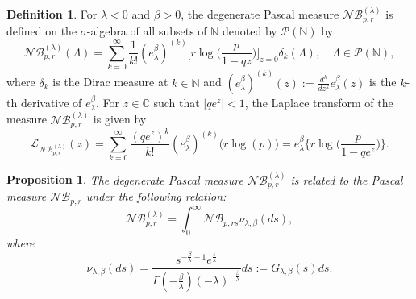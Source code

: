 \documentclass{birkjour}
\newtheorem{prop}[thm]{Proposition}
\theoremstyle{definition}
\newtheorem{defn}[thm]{Definition}
\theoremstyle{remark}
\numberwithin{equation}{section}
\begin{document}
\begin{defn}
For $\lambda< 0$ and $\beta>0$, the degenerate Pascal measure
$\mathcal{N}\mathcal{B}^{(\lambda)}_{p, r}$ is defined on the
$\sigma$-algebra of all subsets of $\mathbb{N}$ denoted by
$\mathcal{P}(\mathbb{N})$ by
\begin{equation}\label{Degenerate_Pascal-measure}
\mathcal{N}\mathcal{B}^{(\lambda)}_{p, r}(\Lambda)=
\displaystyle{\sum^{\infty}_{k=0}\frac{1}{k!}(e^{\beta}_{\lambda})^{(k)}
\Big[r\log\Big(\frac{p}{1-qz}\Big)\Big]_{z=0}\delta_{k}(\Lambda)},\quad
\Lambda\in \mathcal{P}(\mathbb{N}),
\end{equation}
where $\delta_{k}$ is the Dirac measure at $k\in \mathbb{N}$ and
$(e^{\beta}_{\lambda})^{(k)}(z):=\frac{d^{k}}{dz^{k}}e^{\beta}_{\lambda}(z)$
is the $k$-th derivative of $e^{\beta}_{\lambda}$. For $z\in
\mathbb{C}$ such that $|qe^{z}|<1$, the Laplace transform of the
measure $\mathcal{N}\mathcal{B}^{(\lambda)}_{p, r}$ is given by
\begin{equation}\label{laplace-tr-Degen-Pascal}
\mathcal{L}_{\mathcal{N}\mathcal{B}^{(\lambda)}_{p, r}}(z)
=\displaystyle{\sum^{\infty}_{k=0}
\frac{(qe^{z})^{k}}{k!}(e^{\beta}_{\lambda})^{(k)}
\big(r\log(p)\big)}
=\displaystyle{e^{\beta}_{\lambda}\Big\{r\log\big(\frac{p}{1-qe^{z}}\big)\Big\}}.
\end{equation}
\end{defn}
\begin{prop}
The degenerate Pascal measure
$\mathcal{N}\mathcal{B}^{(\lambda)}_{p, r}$ is related to the Pascal
measure $\mathcal{N}\mathcal{B}_{p, r}$ under the following
relation:
\begin{equation}\label{formula1}
\mathcal{N}\mathcal{B}^{(\lambda)}_{p,
r}=\displaystyle{\int^{\infty}_{0}\mathcal{N}\mathcal{B}_{p,
rs}\nu_{\lambda, \beta}(ds)},
\end{equation}
where
\begin{equation}\label{G-func}
\displaystyle{\nu_{\lambda,
\beta}(ds)=\frac{s^{-\frac{\beta}{\lambda}-1}e^{\frac{s}{\lambda}}}{\Gamma(-\frac{\beta}{\lambda})
(-\lambda)^{-\frac{\beta}{\lambda}}}ds:=G_{\lambda, \beta}(s)ds}.
\end{equation}
\end{prop}
\end{document}

